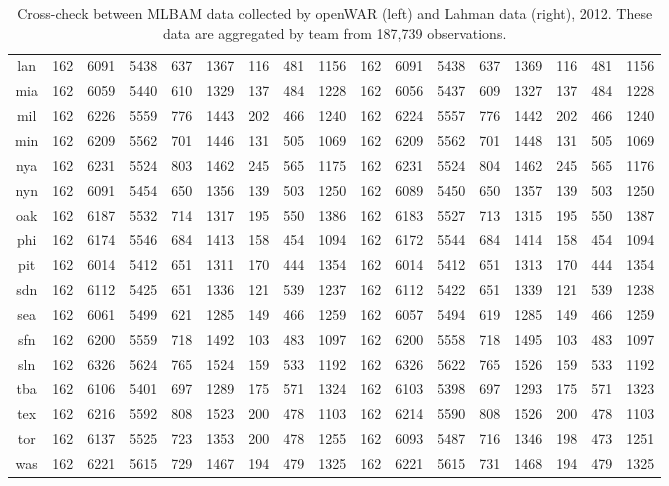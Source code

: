 \documentclass[letterpaper,titlepage]{article}
\begin{document}
\begin{table}[]
{\begin{tabular}{c|cccccccc|cccccccc}
  lan & 162 & 6091 & 5438 & 637 & 1367 & 116 & 481 & 1156 & 162 & 6091 & 5438 & 637 & 1369 & 116 & 481 & 1156 \\ 
  mia & 162 & 6059 & 5440 & 610 & 1329 & 137 & 484 & 1228 & 162 & 6056 & 5437 & 609 & 1327 & 137 & 484 & 1228 \\ 
  mil & 162 & 6226 & 5559 & 776 & 1443 & 202 & 466 & 1240 & 162 & 6224 & 5557 & 776 & 1442 & 202 & 466 & 1240 \\ 
  min & 162 & 6209 & 5562 & 701 & 1446 & 131 & 505 & 1069 & 162 & 6209 & 5562 & 701 & 1448 & 131 & 505 & 1069 \\ 
  nya & 162 & 6231 & 5524 & 803 & 1462 & 245 & 565 & 1175 & 162 & 6231 & 5524 & 804 & 1462 & 245 & 565 & 1176 \\ 
  nyn & 162 & 6091 & 5454 & 650 & 1356 & 139 & 503 & 1250 & 162 & 6089 & 5450 & 650 & 1357 & 139 & 503 & 1250 \\ 
  oak & 162 & 6187 & 5532 & 714 & 1317 & 195 & 550 & 1386 & 162 & 6183 & 5527 & 713 & 1315 & 195 & 550 & 1387 \\ 
  phi & 162 & 6174 & 5546 & 684 & 1413 & 158 & 454 & 1094 & 162 & 6172 & 5544 & 684 & 1414 & 158 & 454 & 1094 \\ 
  pit & 162 & 6014 & 5412 & 651 & 1311 & 170 & 444 & 1354 & 162 & 6014 & 5412 & 651 & 1313 & 170 & 444 & 1354 \\ 
  sdn & 162 & 6112 & 5425 & 651 & 1336 & 121 & 539 & 1237 & 162 & 6112 & 5422 & 651 & 1339 & 121 & 539 & 1238 \\ 
  sea & 162 & 6061 & 5499 & 621 & 1285 & 149 & 466 & 1259 & 162 & 6057 & 5494 & 619 & 1285 & 149 & 466 & 1259 \\ 
  sfn & 162 & 6200 & 5559 & 718 & 1492 & 103 & 483 & 1097 & 162 & 6200 & 5558 & 718 & 1495 & 103 & 483 & 1097 \\ 
  sln & 162 & 6326 & 5624 & 765 & 1524 & 159 & 533 & 1192 & 162 & 6326 & 5622 & 765 & 1526 & 159 & 533 & 1192 \\ 
  tba & 162 & 6106 & 5401 & 697 & 1289 & 175 & 571 & 1324 & 162 & 6103 & 5398 & 697 & 1293 & 175 & 571 & 1323 \\ 
  tex & 162 & 6216 & 5592 & 808 & 1523 & 200 & 478 & 1103 & 162 & 6214 & 5590 & 808 & 1526 & 200 & 478 & 1103 \\ 
  tor & 162 & 6137 & 5525 & 723 & 1353 & 200 & 478 & 1255 & 162 & 6093 & 5487 & 716 & 1346 & 198 & 473 & 1251 \\ 
  was & 162 & 6221 & 5615 & 729 & 1467 & 194 & 479 & 1325 & 162 & 6221 & 5615 & 731 & 1468 & 194 & 479 & 1325 \\ 
   \hline
\end{tabular}
}
\caption{Cross-check between MLBAM data collected by openWAR (left) and Lahman data (right), 2012. These data are aggregated by team from 187,739 observations. } 
\label{tab:crosscheck}
\end{table}
\end{document}
